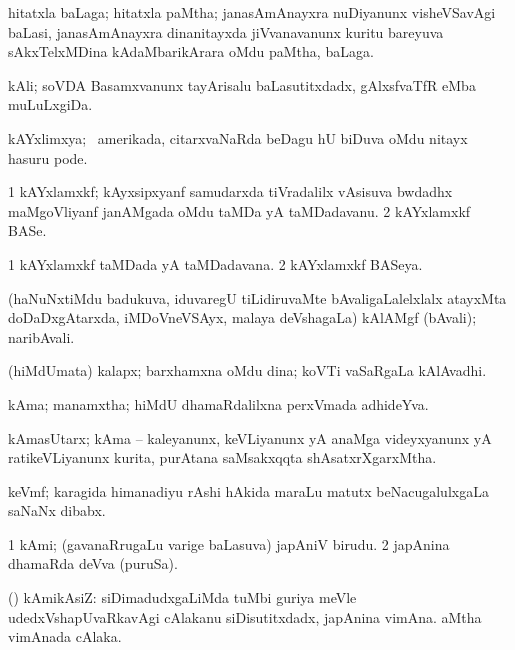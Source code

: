 \bentry
{}
\gl{\nA}
\bmng
hitatxla baLaga; hitatxla paMtha; janasAmAnayxra nuDiyanunx visheVSavAgi baLasi, janasAmAnayxra dinanitayxda jiVvanavanunx kuritu bareyuva sAkxTelxMDina kAdaMbarikArara oMdu paMtha, baLaga. 
\emng
\eentry

\bentry
{}
\gl{\nA}
\bmng
kAli; soVDA Basamxvanunx tayArisalu baLasutitxdadx, gAlxsfvaTfR eMba muLuLxgiDa. 
\emng
\eentry

\bentry
{}
\gl{\nA}
\bmng
kAYxlimxya; \kanu\ amerikada, citarxvaNaRda beDagu hU biDuva oMdu nitayx hasuru pode. 
\emng
\eentry

\bentry
{}
\gl{\nA}
\bmng
\bnum
\num{1} kAYxlamxkf; kAyxsipxyanf samudarxda tiVradalilx vAsisuva bwdadhx maMgoVliyanf janAMgada oMdu taMDa yA taMDadavanu. 
\num{2} kAYxlamxkf BASe. 
\enum
\emng
\eentry

\bentry
{}
\gl{\gu}
\bmng
\bnum
\num{1} kAYxlamxkf taMDada yA taMDadavana. 
\num{2} kAYxlamxkf BASeya. 
\enum
\emng
\eentry

\bentry
{}
\gl{\nA}
\bmng
(haNuNxtiMdu badukuva, iduvaregU tiLidiruvaMte bAvaligaLalelxlalx atayxMta doDaDxgAtarxda, iMDoVneVSAyx, malaya deVshagaLa) kAlAMgf (bAvali); naribAvali. 
\emng
\eentry

\bentry
{}
\gl{\nA}
\bmng
(hiMdUmata) kalapx; barxhamxna oMdu dina;  koVTi vaSaRgaLa kAlAvadhi. 
\emng
\eentry

\bentry
{}
\gl{\nA}
\bmng
kAma; manamxtha; hiMdU dhamaRdalilxna perxVmada adhideYva. 
\emng
\eentry

\bentry
{}
\gl{\nA}
\bmng
kAmasUtarx; kAma -- kaleyanunx, keVLiyanunx yA anaMga videyxyanunx yA ratikeVLiyanunx kurita, purAtana saMsakxqqta shAsatxrXgarxMtha. 
\emng
\eentry

\bentry
{}
\gl{\nA}
\bmng
keVmf; karagida himanadiyu rAshi hAkida maraLu matutx beNacugalulxgaLa saNaNx dibabx. 
\emng
\eentry

\bentry
{}
\gl{\nA}
\bmng
\bnum
\num{1} kAmi; (gavanaRrugaLu \mo varige baLasuva) japAniV birudu. 
\num{2} japAnina dhamaRda deVva (puruSa). 
\enum
\emng
\eentry

\bentry
{}
\gl{\nA}
\bmng
(\ca) kAmikAsiZ: 
\banum
{} siDimadudxgaLiMda tuMbi guriya meVle udedxVshapUvaRkavAgi cAlakanu siDisutitxdadx, japAnina vimAna. 
 aMtha vimAnada cAlaka. 
\eanum
\emng
\eentry

